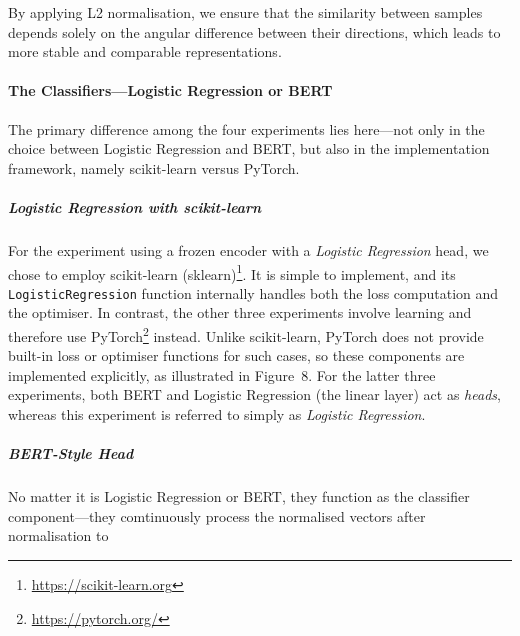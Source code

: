 \documentclass[12pt]{article}
\begin{document}
By applying L2 normalisation, we ensure that the similarity between samples depends solely on the angular difference between their directions, which leads to more stable and comparable representations.

\paragraph{The Classifiers\;---\;Logistic Regression or BERT}
The primary difference among the four experiments lies here\;---\;not only in the choice between Logistic Regression and BERT, but also in the implementation framework, namely scikit-learn versus PyTorch.

\subparagraph{Logistic Regression with scikit-learn}
For the experiment using a frozen encoder with a \textit{Logistic Regression} head, we chose to employ scikit-learn (sklearn)\footnote{\url{https://scikit-learn.org}}. 
It is simple to implement, and its \texttt{LogisticRegression} function internally handles both the loss computation and the optimiser. 
In contrast, the other three experiments involve learning and therefore use PyTorch\footnote{\url{https://pytorch.org/}} instead. 
Unlike scikit-learn, PyTorch does not provide built-in loss or optimiser functions for such cases, so these components are implemented explicitly, as illustrated in Figure~8. 
For the latter three experiments, both BERT and Logistic Regression (the linear layer) act as \textit{heads}, whereas this experiment is referred to simply as \textit{Logistic Regression}.

\subparagraph{BERT-Style Head}
No matter it is Logistic Regression or BERT, they function as the classifier component\;---\;they comtinuously process the normalised vectors after normalisation to 
\end{document}
